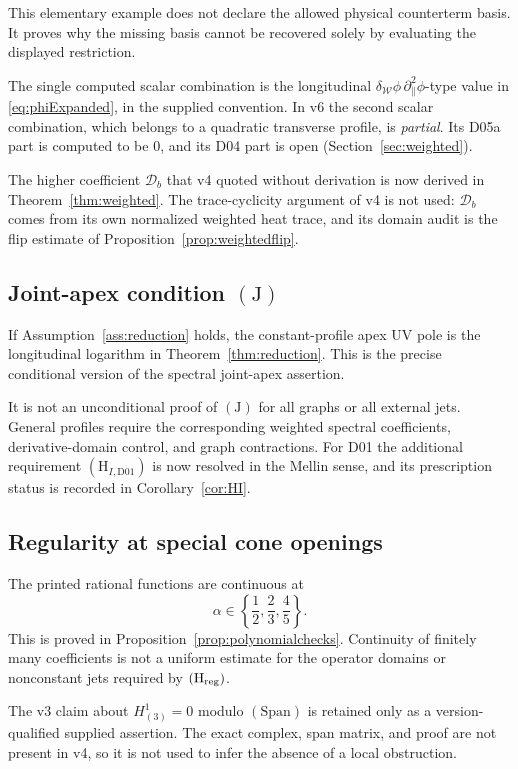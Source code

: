 \documentclass[11pt,a4paper]{article}
\newcommand{\WW}{\mathcal W}
\newcommand{\Hreg}{(\mathrm H_{\rm reg})}
\newcommand{\Span}{(\mathrm{Span})}
\newcommand{\Jcond}{(\mathrm J)}
\theoremstyle{plain}
\theoremstyle{definition}
\theoremstyle{remark}
\numberwithin{equation}{section}
\begin{document}
This elementary example does not declare the allowed physical
counterterm basis. It proves why the missing basis cannot be
recovered solely by evaluating the displayed restriction.

The single computed scalar combination is the longitudinal
\(\delta_{\WW}\phi\,\partial_\parallel^2\phi\)-type value in
\eqref{eq:phiExpanded}, in the supplied convention.
In v6 the second scalar combination, which belongs to a quadratic
transverse profile, is \emph{partial}.
Its D05a part is computed to be \(0\), and its D04 part is open
(Section~\ref{sec:weighted}).

The higher coefficient \(\mathcal D_b\) that v4 quoted without
derivation is now derived in Theorem~\ref{thm:weighted}.
The trace-cyclicity argument of v4 is not used: \(\mathcal D_b\)
comes from its own normalized weighted heat trace, and its domain
audit is the flip estimate of Proposition~\ref{prop:weightedflip}.

\subsection{Joint-apex condition \(\Jcond\)}

If Assumption~\ref{ass:reduction} holds, the constant-profile apex UV
pole is the longitudinal logarithm in
Theorem~\ref{thm:reduction}. This is the precise conditional
version of the spectral joint-apex assertion.

It is not an unconditional proof of \(\Jcond\) for all graphs
or all external jets.
General profiles require the corresponding weighted spectral
coefficients, derivative-domain control, and graph contractions.
For D01 the additional requirement
\((\mathrm H_{I,\mathrm{D01}})\) is now resolved in the Mellin
sense, and its prescription status is recorded in
Corollary~\ref{cor:HI}.

\subsection{Regularity at special cone openings}

The printed rational functions are continuous at
\[
\alpha\in\left\{\frac12,\frac23,\frac45\right\}.
\]
This is proved in Proposition~\ref{prop:polynomialchecks}.
Continuity of finitely many coefficients is not a uniform estimate
for the operator domains or nonconstant jets required by \(\Hreg\).

The v3 claim about
\(H^1_{(3)}=0\) modulo \(\Span\) is retained only as a
version-qualified supplied assertion.
The exact complex, span matrix, and proof are not present in v4,
so it is not used to infer the absence of a local obstruction.
\end{document}
